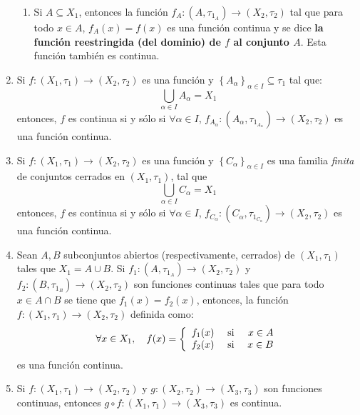 \documentclass[12pt]{report}
\theoremstyle{largebreak}
\newcommand\cf[3]{\ensuremath{#1:#2\rightarrow#3}}
\begin{document}
\begin{exa}
\begin{enumerate}
\begin{enumerate}
                \item Si $A\subseteq X_1$, entonces la función $\cf{f_A}{(A,\tau_{1_A})}{(X_2,\tau_2)}$ tal que para todo $x\in A$, $f_A(x)=f(x)$ es una función continua y se dice \textbf{la función reestringida (del dominio) de $f$ al conjunto $A$}. Esta función también es continua.
            \end{enumerate}
            \item Si $\cf{f}{(X_1,\tau_1)}{(X_2,\tau_2)}$ es una función y $\left\{A_\alpha\right\}_{ \alpha\in I}\subseteq \tau_1$ tal que:
            \begin{equation*}
                \bigcup_{\alpha\in I}A_\alpha=X_1
            \end{equation*}
            entonces, $f$ es continua si y sólo si $\forall \alpha\in I$, $\cf{f_{A_\alpha}}{(A_\alpha,\tau_{1_{A_\alpha}})}{(X_2,\tau_2)}$ es una función continua.
            \item Si $\cf{f}{(X_1,\tau_1)}{(X_2,\tau_2)}$ es una función y $\left\{ C_\alpha\right\}_{\alpha\in I}$ es una familia \textit{finita} de conjuntos cerrados en $(X_1,\tau_1)$, tal que
            \begin{equation*}
                \bigcup_{\alpha\in I}C_\alpha=X_1
            \end{equation*}
            entonces, $f$ es continua si y sólo si $\forall \alpha\in I$, $\cf{f_{C_\alpha}}{(C_\alpha,\tau_{1_{C_\alpha}})}{(X_2,\tau_2)}$ es una función continua.

            \item Sean $A,B$ subconjuntos abiertos (respectivamente, cerrados) de $(X_1,\tau_1)$ tales que $X_1=A\cup B$. Si $\cf{f_1}{(A,\tau_{1_A})}{(X_2,\tau_2)}$ y $\cf{f_2}{(B,\tau_{1_B})}{(X_2,\tau_2)}$ son funciones continuas tales que para todo $x\in A\cap B$ se tiene que $f_1(x)=f_2(x)$, entonces, la función $\cf{f}{(X_1,\tau_1)}{(X_2,\tau_2)}$ definida como:
            \begin{equation*}
                \forall x\in X_1,\quad f(x)=\left\{ \begin{array}{lcr}
                    f_1(x) &\textup{ si }& x\in A\\
                    f_2(x) &\textup{ si }& x\in B\\
                \end{array}\right.
            \end{equation*}
            es una función continua.

            \item Si $\cf{f}{(X_1,\tau_1)}{(X_2,\tau_2)}$ y $\cf{g}{(X_2,\tau_2)}{(X_3,\tau_3)}$ son funciones continuas, entonces $\cf{g\circ f}{(X_1,\tau_1)}{(X_3,\tau_3)}$ es continua.
        \end{enumerate}
    \end{exa}
\end{document}
